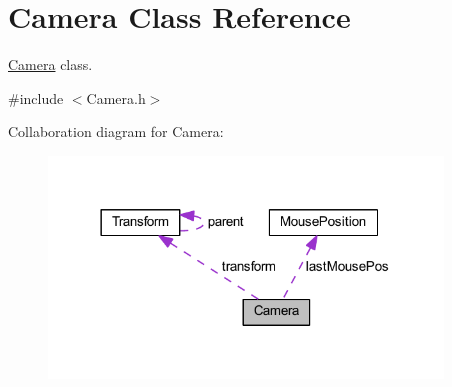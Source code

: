 \hypertarget{class_camera}{}\section{Camera Class Reference}
\label{class_camera}


\mbox{\hyperlink{class_camera}{Camera}} class.  




{\ttfamily \#include $<$Camera.\+h$>$}



Collaboration diagram for Camera\+:\nopagebreak
\begin{figure}[H]
\begin{center}
\leavevmode
\includegraphics[width=297pt]{class_camera__coll__graph}
\end{center}
\end{figure}
